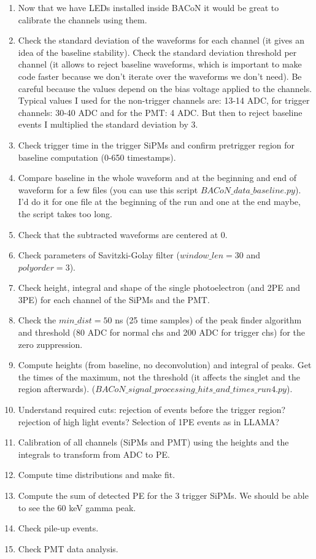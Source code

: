 \documentclass[11pt,a4paper,english,oneside, pdf]{article}
\begin{document}
	\begin{enumerate}
		\item Now that we have LEDs installed inside BACoN it would be great to calibrate the channels using them.
		\item Check the standard deviation of the waveforms for each channel (it gives an idea of the baseline stability). Check the standard deviation threshold per channel (it allows to reject baseline waveforms, which is important to make code faster because we don't iterate over the waveforms we don't need). Be careful because the values depend on the bias voltage applied to the channels. Typical values I used for the non-trigger channels are: 13-14 ADC, for trigger channels: 30-40 ADC and for the PMT: 4 ADC. But then to reject baseline events I multiplied the standard deviation by 3.
		\item Check trigger time in the trigger SiPMs and confirm pretrigger region for baseline computation (0-650 timestamps).
		\item Compare baseline in the whole waveform and at the beginning and end of waveform for a few files (you can use this script  \href{https://github.com/carmenromo/BACON/blob/main/Run4_code/BACoN_data_baseline.py}{$BACoN\_data\_baseline.py$}). I'd do it for one file at the beginning of the run and one at the end maybe, the script takes too long.
		\item Check that the subtracted waveforms are centered at 0.
		\item Check parameters of Savitzki-Golay filter ($window\_len=30$ and $polyorder=3$).
		\item Check height, integral and shape of the single photoelectron (and 2PE and 3PE) for each channel of the SiPMs and the PMT.
		\item Check the $min\_dist=50$ ns (25 time samples) of the peak finder algorithm and threshold (80 ADC for normal chs and 200 ADC for trigger chs) for the zero zuppression.
		\item Compute heights (from baseline, no deconvolution) and integral of peaks. Get the times of the maximum, not the threshold (it affects the singlet and the region afterwards). (\href{https://github.com/carmenromo/BACON/blob/main/Run4_code/BACoN_signal_processing_hits_and_times_run4.py}{$BACoN\_signal\_processing\_hits\_and\_times\_run4.py$}).
		\item Understand required cuts: rejection of events before the trigger region? rejection of high light events? Selection of 1PE events as in LLAMA?
		\item Calibration of all channels (SiPMs and PMT) using the heights and the integrals to transform from ADC to PE.
		\item Compute time distributions and make fit.
		\item Compute the sum of detected PE for the 3 trigger SiPMs. We should be able to see the 60 keV gamma peak.
		\item Check pile-up events.
		\item Check PMT data analysis.
	\end{enumerate}
	
	
\end{document}
